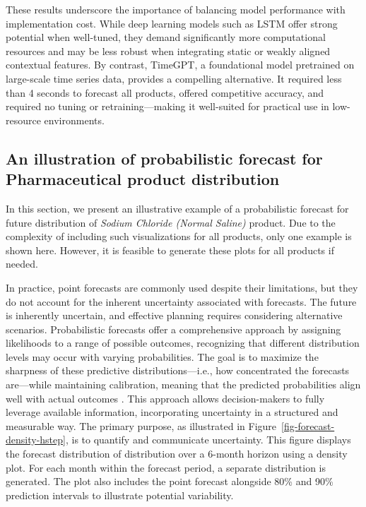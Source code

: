 \documentclass[
  authoryear,
  preprint,
  3p]{elsarticle}
\begin{document}
These results underscore the importance of balancing model performance
with implementation cost. While deep learning models such as LSTM offer
strong potential when well-tuned, they demand significantly more
computational resources and may be less robust when integrating static
or weakly aligned contextual features. By contrast, TimeGPT, a
foundational model pretrained on large-scale time series data, provides
a compelling alternative. It required less than 4 seconds to forecast
all products, offered competitive accuracy, and required no tuning or
retraining---making it well-suited for practical use in low-resource
environments.

\subsection{An illustration of probabilistic forecast for Pharmaceutical
product
distribution}\label{an-illustration-of-probabilistic-forecast-for-pharmaceutical-product-distribution}

In this section, we present an illustrative example of a probabilistic
forecast for future distribution of \emph{Sodium Chloride (Normal
Saline)} product. Due to the complexity of including such visualizations
for all products, only one example is shown here. However, it is
feasible to generate these plots for all products if needed.

In practice, point forecasts are commonly used despite their
limitations, but they do not account for the inherent uncertainty
associated with forecasts. The future is inherently uncertain, and
effective planning requires considering alternative scenarios.
Probabilistic forecasts offer a comprehensive approach by assigning
likelihoods to a range of possible outcomes, recognizing that different
distribution levels may occur with varying probabilities. The goal is to
maximize the sharpness of these predictive distributions---i.e., how
concentrated the forecasts are---while maintaining calibration, meaning
that the predicted probabilities align well with actual outcomes
\citep{gneiting2014probabilistic}. This approach allows decision-makers
to fully leverage available information, incorporating uncertainty in a
structured and measurable way. The primary purpose, as illustrated in
Figure~\ref{fig-forecast-density-hstep}, is to quantify and communicate
uncertainty. This figure displays the forecast distribution of
distribution over a 6-month horizon using a density plot. For each month
within the forecast period, a separate distribution is generated. The
plot also includes the point forecast alongside 80\% and 90\% prediction
intervals to illustrate potential variability.
\end{document}
